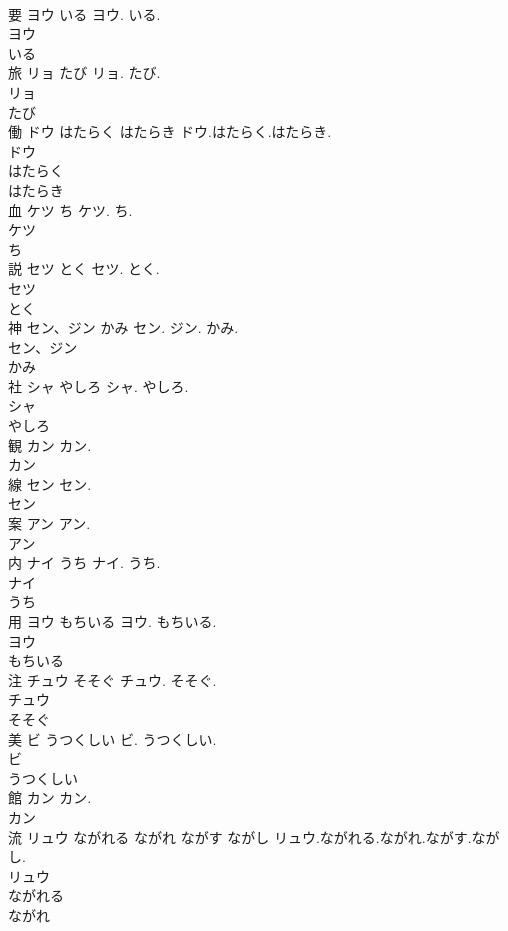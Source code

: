 \documentclass[8pt]{extreport}
\begin{document}
\begin{CJK}{UTF8}{min}
\\	要	ヨウ いる	ヨウ. いる.	
\\	ヨウ
\\	いる
\\	旅	リョ たび	リョ. たび.	
\\	リョ
\\	たび
\\	働	ドウ はたらく はたらき	ドウ.はたらく.はたらき.	
\\	ドウ
\\	はたらく
\\	はたらき
\\	血	ケツ ち	ケツ. ち.	
\\	ケツ
\\	ち
\\	説	セツ とく	セツ. とく.	
\\	セツ
\\	とく
\\	神	セン、ジン かみ	セン. ジン. かみ.	
\\	セン、ジン
\\	かみ
\\	社	シャ やしろ	シャ. やしろ.	
\\	シャ
\\	やしろ
\\	観	カン	カン.	
\\	カン
\\	線	セン	セン.	
\\	セン
\\	案	アン	アン.	
\\	アン
\\	内	ナイ うち	ナイ. うち.	
\\	ナイ
\\	うち
\\	用	ヨウ もちいる	ヨウ. もちいる.	
\\	ヨウ
\\	もちいる
\\	注	チュウ そそぐ	チュウ. そそぐ.	
\\	チュウ
\\	そそぐ
\\	美	ビ うつくしい	ビ. うつくしい.	
\\	ビ
\\	うつくしい
\\	館	カン	カン.	
\\	カン
\\	流	リュウ ながれる ながれ ながす ながし	リュウ.ながれる.ながれ.ながす.ながし.	
\\	リュウ
\\	ながれる
\\	ながれ

\end{CJK}
\end{document}
